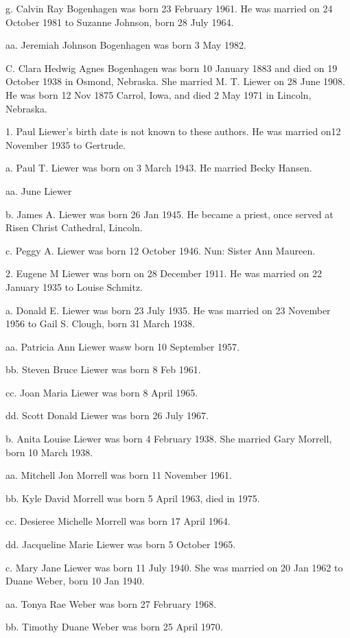 \documentclass[a4paper]{article}
\begin{document}
g. Calvin Ray Bogenhagen was born 23 February 1961.  He was married on 24 October 1981 to Suzanne Johnson, born 28 July 1964. 

aa. Jeremiah Johnson Bogenhagen was born 3 May 1982.

C.  Clara Hedwig Agnes Bogenhagen was born 10 January 1883 and died on 19 October 1938 in Osmond, Nebraska.  She married M. T. Liewer on 28 June 1908.  He was born 12 Nov 1875 Carrol, Iowa, and died 2 May 1971 in Lincoln, Nebraska.

1. Paul Liewer's birth date is not known to these authors.  He was married on12 November 1935 to Gertrude.

a. Paul T. Liewer was born on 3 March 1943.  He married Becky Hansen.

aa. June Liewer

b. James A. Liewer was born 26 Jan 1945.  He became a priest, once served at Risen Christ Cathedral, Lincoln.

c. Peggy A. Liewer was born 12 October 1946.  Nun: Sister Ann Maureen.

2. Eugene M Liewer was born on 28 December 1911.  He was married on 22 January 1935 to Louise Schmitz.

a. Donald E. Liewer was born 23 July 1935.  He was married on 23 November 1956 to Gail S. Clough, born 31 March 1938.

aa. Patricia Ann Liewer wasw born 10 September 1957.

bb. Steven Bruce Liewer was born 8 Feb 1961.

cc. Joan Maria Liewer was born 8 April 1965.

dd. Scott Donald Liewer was born 26 July 1967.

b. Anita Louise Liewer was born 4 February 1938.  She married Gary Morrell, born 10 March 1938.

aa. Mitchell Jon Morrell was born 11 November 1961.

bb. Kyle David Morrell was born 5 April 1963, died in 1975.

cc. Desieree Michelle Morrell was born 17 April 1964.

dd. Jacqueline Marie Liewer was born 5 October 1965.

c. Mary Jane Liewer was born 11 July 1940.  She was married on 20 Jan 1962 to Duane Weber, born 10 Jan 1940.

aa. Tonya Rae Weber was born 27 February 1968.

bb. Timothy Duane Weber was born 25 April 1970.
\end{document}
